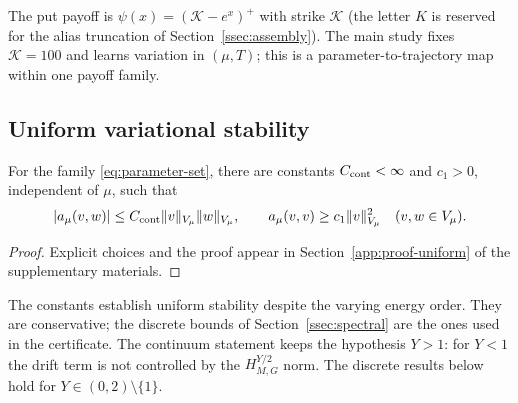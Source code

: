 \documentclass[hidelinks]{siamart251216}
\begin{document}
The put payoff is $\psi(x)=(\mathcal K-e^x)^+$ with strike $\mathcal K$ (the letter $K$ is reserved
for the alias truncation of Section~\ref{ssec:assembly}). The main study fixes $\mathcal K=100$ and
learns variation in $(\mu,T)$; this is a parameter-to-trajectory map within
one payoff family.

\subsection{Uniform variational stability}
\label{ssec:uniform}
\begin{theorem}
\label{thm:uniform-coercivity}
For the family \eqref{eq:parameter-set}, there are constants
$C_{\rm cont}<\infty$ and $c_1>0$, independent of $\mu$, such that
\begin{equation}
 |a_\mu(v,w)|\le C_{\rm cont}\|v\|_{V_\mu}\|w\|_{V_\mu},
 \qquad a_\mu(v,v)\ge c_1\|v\|_{V_\mu}^2
 \quad(v,w\in V_\mu).
 \label{eq:uniform-coercivity}
\end{equation}
\end{theorem}
\begin{proof}
Explicit choices and the proof appear in Section~\ref{app:proof-uniform} of the supplementary materials.
\end{proof}
The constants establish uniform stability despite the varying energy order.
They are conservative; the discrete bounds of Section~\ref{ssec:spectral} are the ones used
in the certificate.  The continuum statement keeps the hypothesis $Y>1$: for $Y<1$ the drift
term is not controlled by the $H^{Y/2}_{M,G}$ norm.  The discrete results below hold for
$Y\in(0,2)\setminus\{1\}$.

\end{document}
